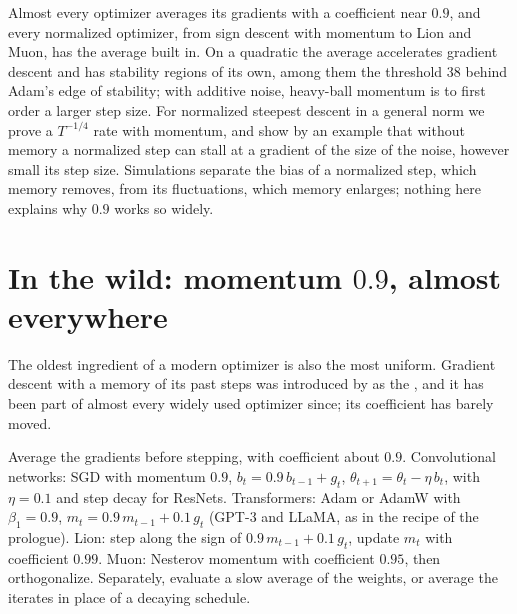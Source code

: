\newcommand{\momentummed}{\operatorname{med}}
\newcommand{\momentumzbar}{\bar\zeta}

\begin{refsection}

\begin{chaptersummary}
Almost every optimizer averages its gradients with a coefficient near $0.9$, and every normalized optimizer, from sign descent with momentum to Lion and Muon, has the average built in. On a quadratic the average accelerates gradient descent and has stability regions of its own, among them the threshold $38$ behind Adam's edge of stability; with additive noise, heavy-ball momentum is to first order a larger step size. For normalized steepest descent in a general norm we prove a $T^{-1/4}$ rate with momentum, and show by an example that without memory a normalized step can stall at a gradient of the size of the noise, however small its step size. Simulations separate the bias of a normalized step, which memory removes, from its fluctuations, which memory enlarges; nothing here explains why $0.9$ works so widely.
\end{chaptersummary}

\section{In the wild: momentum \texorpdfstring{$0.9$}{0.9}, almost everywhere}\label{sec:momentum:wild}

The oldest ingredient of a modern optimizer is also the most uniform. Gradient descent with a memory of its past steps was introduced by \textcite{Polyak1964} as the , and it has been part of almost every widely used optimizer since; its coefficient has barely moved.

\begin{practice}
Average the gradients before stepping, with coefficient about $0.9$. Convolutional networks: SGD with momentum $0.9$, $b_t=0.9\,b_{t-1}+g_t$, $\theta_{t+1}=\theta_t-\eta\,b_t$, with $\eta=0.1$ and step decay for ResNets. Transformers: Adam or AdamW with $\beta_1=0.9$, $m_t=0.9\,m_{t-1}+0.1\,g_t$ (GPT-3 and LLaMA, as in the recipe of the prologue). Lion: step along the sign of $0.9\,m_{t-1}+0.1\,g_t$, update $m_t$ with coefficient $0.99$. Muon: Nesterov momentum with coefficient $0.95$, then orthogonalize. Separately, evaluate a slow average of the weights, or average the iterates in place of a decaying schedule.
\end{practice}


\end{refsection}
